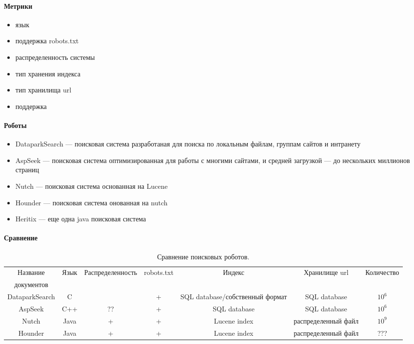 \paragraph{Метрики}
\begin{itemize}
 \item язык
 \item поддержка robots.txt
 \item распределенность системы
 \item тип хранения индекса
 \item тип хранилища url
 \item поддержка
\end{itemize}
\paragraph{Роботы}
\begin{itemize}
 \item DataparkSearch --- поисковая система разработаная для поиска по локальным файлам, группам сайтов и интранету
 \item AspSeek --- поисковая система оптимизированная для работы с многими сайтами, и средней загрузкой --- до нескольких миллионов страниц
 \item Nutch --- поисковая система основанная на Lucene
 \item Hounder --- поисковая система онованная на nutch
 \item Heritix --- еще одна java поисковая система
\end{itemize}
\paragraph{Сравнение}
\begin{table}[h]
\caption{\label{tab:crawlers}Сравнение поисковых роботов.}
\begin{center}
\begin{turn}{90}
\begin{tabular}{|c|c|c|c|c|c|c|}
\hline
Название & Язык & Распределенность & robots.txt & Индекс & Хранилище url & Количество\\ документов\\
\hline
DataparkSearch & C & ~ & + & SQL database/собственный формат & SQL database & $10^{6}$\\
\hline
AspSeek & C++ & ?? & + & SQL database & SQL database & $10^{6}$\\
\hline
Nutch & Java & + & + & Lucene index & распределенный файл & $10^{9}$\\
\hline
Hounder & Java & + & + & Lucene index & распределенный файл & ???\\
\hline
\end{tabular}
\end{turn}
\end{center}
\end{table}


